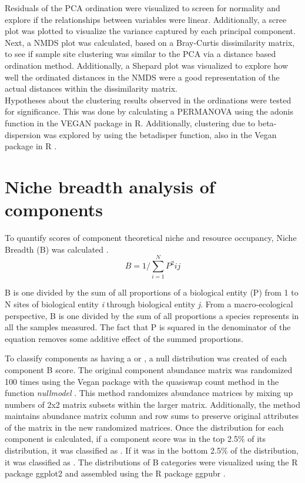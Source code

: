 Residuals of the PCA ordination were visualized to screen for normality and explore if the relationships between variables were linear. Additionally, a scree plot was plotted to visualize the variance captured by each principal component. Next, a NMDS plot was calculated, based on a Bray-Curtis dissimilarity matrix, to see if sample site clustering was similar to the PCA via a distance based ordination method. Additionally, a Shepard plot was visualized to explore how well the ordinated distances in the NMDS were a good representation of the actual distances within the dissimilarity matrix.\\

Hypotheses about the clustering results observed in the ordinations were tested for significance. This was done by calculating a PERMANOVA using the adonis function in the VEGAN package in R. Additionally, clustering due to beta-dispersion was explored by using the betadisper function, also in the Vegan package in R \citep{Oksanen_2017}.

\section{Niche breadth analysis of components}

To quantify scores of component theoretical niche and resource occupancy, Niche Breadth (B) was calculated \citep{Levins_1966}.\\

\[B = 1/\sum_{i=1}^{N}P^2ij \]

B is one divided by the sum of all proportions of a biological entity (P) from 1 to N sites of biological entity \textit{i}  through biological entity \textit{j}. From a macro-ecological perspective, B is one divided by the sum of all proportions a species represents in all the samples measured. The fact that P is squared in the denominator of the equation removes some additive effect of the summed proportions. 

To classify components as having a  or , a null distribution was created of each component B score. The original component abundance matrix was randomized 100 times using the Vegan package with the quasiswap count method in the function \textit{nullmodel} \citep{Mikls_2004, Oksanen_2017}. This method randomizes abundance matrices by mixing up numbers of 2x2 matrix subsets within the larger matrix. Additionally, the method maintains abundance matrix column and row sums to preserve original attributes of the matrix in the new randomized matrices. Once the distribution for each component is calculated, if a component score was in the top 2.5\% of its distribution, it was classified as . If it was in the bottom 2.5\% of the distribution, it was classified as . The distributions of B categories were visualized using the R package ggplot2 \citep{Wickham_2016} and assembled using the R package ggpubr \citep{Kassambara_2017}.\\

